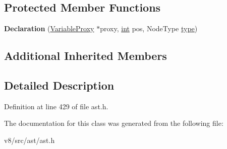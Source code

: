 \subsection*{Protected Member Functions}
\begin{DoxyCompactItemize}
\item 
\mbox{\label{classv8_1_1internal_1_1Declaration_ade13ec791ec1562f216e14c1b5e40e9a}} 
{\bfseries Declaration} (\mbox{\hyperlink{classv8_1_1internal_1_1VariableProxy}{Variable\+Proxy}} $\ast$proxy, \mbox{\hyperlink{classint}{int}} pos, Node\+Type \mbox{\hyperlink{classstd_1_1conditional_1_1type}{type}})
\end{DoxyCompactItemize}
\subsection*{Additional Inherited Members}


\subsection{Detailed Description}


Definition at line 429 of file ast.\+h.



The documentation for this class was generated from the following file\+:\begin{DoxyCompactItemize}
\item 
v8/src/ast/ast.\+h\end{DoxyCompactItemize}
